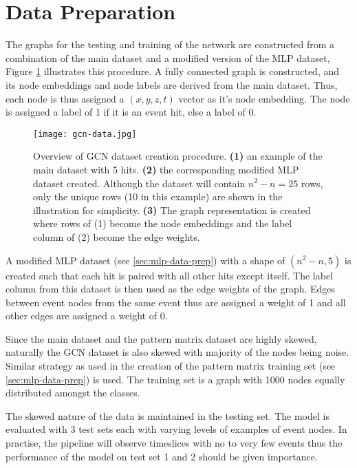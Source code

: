\section{Data Preparation}
\label{sec:gcn-data-prep}

The graphs for the testing and training of the network are constructed
from a combination of the main dataset and a modified version of the
MLP dataset, Figure \ref{fig:gcn-data} illustrates this procedure. A
fully connected graph is constructed, and its node embeddings and node
labels are derived from the main dataset. Thus, each node is thus
assigned a $(x,y,z,t)$ vector as it's node embedding. The node is
assigned a label of 1 if it is an event hit, else a label of 0.

\begin{figure}[h]
  \centering
  \texttt{[image: gcn-data.jpg]}
  \caption{Overview of GCN dataset creation procedure. \textbf{(1)} an
    example of the main dataset with 5 hits. \textbf{(2)} the
    corresponding modified MLP dataset created. Although the dataset
    will contain $n^{2}-n = 25$ rows, only the unique rows (10 in this
    example) are shown in the illustration for simplicity.
    \textbf{(3)} The graph representation is created where rows of (1)
    become the node embeddings and the label column of (2) become the
    edge weights.}
  \label{fig:gcn-data}
\end{figure}

A modified MLP dataset (see \ref{sec:mlp-data-prep}) with a shape of
\texttt{$(n^{2}-n, 5)$} is created such that each hit is paired with
all other hits except itself. The label column from this dataset is
then used as the edge weights of the graph. Edges between event nodes
from the same event thus are assigned a weight of 1 and all other
edges are assigned a weight of 0.

Since the main dataset and the pattern matrix dataset are highly
skewed, naturally the GCN dataset is also skewed with majority of the
nodes being noise. Similar strategy as used in the creation of the
pattern matrix training set (see \ref{sec:mlp-data-prep}) is
used. The training set is a graph with 1000 nodes equally distributed
amongst the classes.

The skewed nature of the data is maintained in the testing set. The
model is evaluated with 3 test sets each with varying levels of
examples of event nodes. In practise, the pipeline will observe
timeslices with no to very few events thus the performance of the
model on test set 1 and 2 should be given importance.

